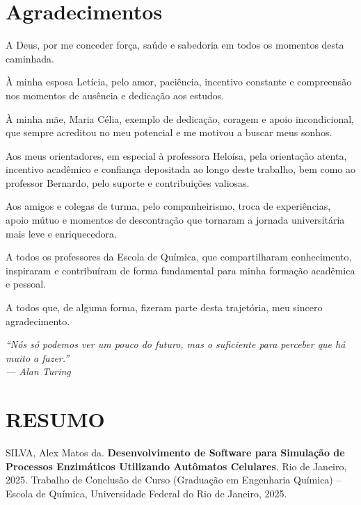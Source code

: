 \documentclass[12pt,oneside]{report}
\begin{document}
\chapter*{Agradecimentos}

A Deus, por me conceder força, saúde e sabedoria em todos os momentos desta caminhada.

À minha esposa Letícia, pelo amor, paciência, incentivo constante e compreensão nos momentos de ausência e dedicação aos estudos.

À minha mãe, Maria Célia, exemplo de dedicação, coragem e apoio incondicional, que sempre acreditou no meu potencial e me motivou a buscar meus sonhos.

Aos meus orientadores, em especial à professora Heloísa, pela orientação atenta, incentivo acadêmico e confiança depositada ao longo deste trabalho, bem como ao professor Bernardo, pelo suporte e contribuições valiosas.

Aos amigos e colegas de turma, pelo companheirismo, troca de experiências, apoio mútuo e momentos de descontração que tornaram a jornada universitária mais leve e enriquecedora.

A todos os professores da Escola de Química, que compartilharam conhecimento, inspiraram e contribuíram de forma fundamental para minha formação acadêmica e pessoal.

A todos que, de alguma forma, fizeram parte desta trajetória, meu sincero agradecimento.

\newpage

\vspace*{\fill}
\begin{flushright}
    \begin{minipage}{0.6\textwidth}
        \raggedleft
        \textit{``Nós só podemos ver um pouco do futuro, mas o suficiente para perceber que há muito a fazer.''} \\
        \textit{— Alan Turing}
    \end{minipage}
\end{flushright}
\vspace*{4cm}

\chapter*{\MakeUppercase{Resumo}}
SILVA, Alex Matos da. \textbf{Desenvolvimento de Software para Simulação de Processos Enzimáticos Utilizando Autômatos Celulares}. Rio de Janeiro, 2025. Trabalho de Conclusão de Curso (Graduação em Engenharia Química) – Escola de Química, Universidade Federal do Rio de Janeiro, 2025.
\end{document}
